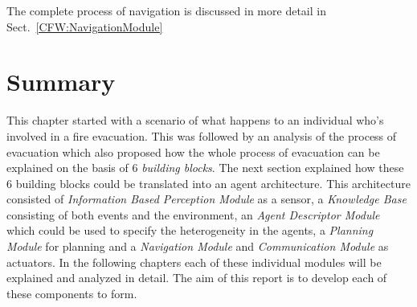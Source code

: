 The complete process of navigation is discussed in more detail in Sect.~\ref{CFW:NavigationModule}

\section{Summary}
\label{IBEVAC:Summary}

This chapter started with a scenario of what happens to an individual who's involved in a fire evacuation. This was followed by an analysis of the process of evacuation which also proposed how the whole process of evacuation can be explained on the basis of 6 \emph{building blocks}. The next section explained how these 6 building blocks could be translated into an agent architecture. This architecture consisted of \emph{Information Based Perception Module} as a sensor, a \emph{Knowledge Base} consisting of both events and the environment, an \emph{Agent Descriptor Module} which could be used to specify the heterogeneity in the agents, a \emph{Planning Module} for planning and a \emph{Navigation Module} and \emph{Communication Module} as actuators. In the following chapters each of these individual modules will be explained and analyzed in detail. The aim of this report is to develop each of these components to form.
